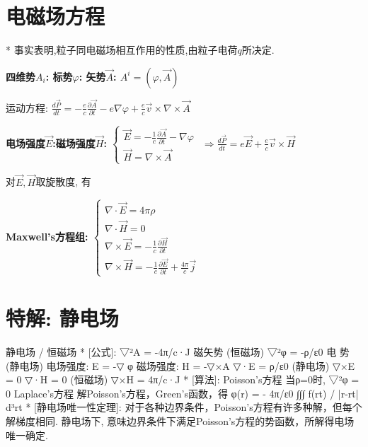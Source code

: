     \section{电磁场方程}
        * 事实表明,粒子同电磁场相互作用的性质,由粒子电荷$q$所决定.
    
        \bf{四维势$A_{i}$: \quad 标势$\varphi$: \quad 矢势$\vec A$:}
            $A^{i}=(\varphi,\vec A)$
            
        运动方程:
            $\frac{d\vec P}{dt} = - \frac{e}{c} \frac{\partial\vec A}{\partial t} - e \nabla \varphi + \frac{e}{c} \vec v \times \nabla \times \vec A$
            
        \bf{电场强度$\vec E$:\quad 磁场强度$\vec H$:}
            $
                \left\{ \begin{array}{ll}
                \vec E = -\frac{1}{c} \frac{\partial \vec A}{\partial t} - \nabla \varphi\\
                \vec H = \nabla \times \vec A
                \end{array} \right.
            $
            $\Rightarrow \frac{d\vec P}{dt} = e \vec E + \frac{e}{c} \vec v \times \vec H$
            
        对$\vec E,\vec H$取旋散度, 有
        
        \bf{Maxwell's方程组}:
            $
                \left\{ \begin{array}{ll}
                \nabla \cdot \vec E = 4\pi\rho\\
                \nabla \cdot \vec H = 0\\
                \nabla \times \vec E = - \frac{1}{c} \frac{\partial \vec H}{\partial t}\\
                \nabla \times \vec H = - \frac{1}{c} \frac{\partial \vec E}{\partial t} + \frac{4\pi}{c}\vec j
                \end{array} \right.
            $


\section{特解: 静电场}
静电场  /  恒磁场
*	[公式]: 
		▽²A  = -4π/c·J		磁矢势 (恒磁场)
		▽²φ = -ρ/ε0			电  势 (静电场)
		电场强度: E = -▽ φ
		磁场强度: H = -▽×A
		▽·E = ρ/ε0			(静电场)
		▽×E = 0
		▽·H = 0				(恒磁场)
		▽×H = 4π/c·J
*	[算法]:	Poisson's方程		
		当ρ=0时, ▽²φ = 0		Laplace's方程
		解Poisson's方程，Green's函数，得 φ(r) = - 4π/ε0 ∫∫∫ f(rt) / |r-rt| d³rt
*	[静电场唯一性定理]:
		对于各种边界条件，Poisson's方程有许多种解，但每个解梯度相同.
		静电场下, 意味边界条件下满足Poisson's方程的势函数，所解得电场唯一确定.

